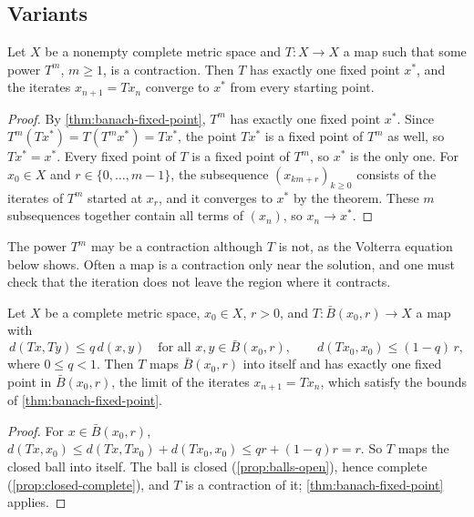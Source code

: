 \subsection{Variants}

\begin{corollary}
\label{cor:power-contraction}
Let $X$ be a nonempty complete metric space and $T\colon X\to X$ a map such that some power $T^m$, $m\ge1$, is a contraction. Then $T$ has exactly one fixed point $x^*$, and the iterates $x_{n+1}=Tx_n$ converge to $x^*$ from every starting point.
\end{corollary}

\begin{proof}
By \cref{thm:banach-fixed-point}, $T^m$ has exactly one fixed point $x^*$. Since $T^m(Tx^*)=T(T^mx^*)=Tx^*$, the point $Tx^*$ is a fixed point of $T^m$ as well, so $Tx^*=x^*$. Every fixed point of $T$ is a fixed point of $T^m$, so $x^*$ is the only one. For $x_0\in X$ and $r\in\{0,\ldots,m-1\}$, the subsequence $(x_{km+r})_{k\ge0}$ consists of the iterates of $T^m$ started at $x_r$, and it converges to $x^*$ by the theorem. These $m$ subsequences together contain all terms of $(x_n)$, so $x_n\to x^*$.
\end{proof}

The power $T^m$ may be a contraction although $T$ is not, as the Volterra equation below shows. Often a map is a contraction only near the solution, and one must check that the iteration does not leave the region where it contracts.

\begin{theorem}
\label{thm:local-contraction}
Let $X$ be a complete metric space, $x_0\in X$, $r>0$, and $T\colon\bar B(x_0,r)\to X$ a map with
\[
d(Tx,Ty)\le q\,d(x,y)\quad\text{for all }x,y\in\bar B(x_0,r),\qquad d(Tx_0,x_0)\le(1-q)\,r ,
\]
where $0\le q<1$. Then $T$ maps $\bar B(x_0,r)$ into itself and has exactly one fixed point in $\bar B(x_0,r)$, the limit of the iterates $x_{n+1}=Tx_n$, which satisfy the bounds of \cref{thm:banach-fixed-point}.
\end{theorem}

\begin{proof}
For $x\in\bar B(x_0,r)$, $d(Tx,x_0)\le d(Tx,Tx_0)+d(Tx_0,x_0)\le qr+(1-q)r=r$. So $T$ maps the closed ball into itself. The ball is closed (\cref{prop:balls-open}), hence complete (\cref{prop:closed-complete}), and $T$ is a contraction of it; \cref{thm:banach-fixed-point} applies.
\end{proof}


